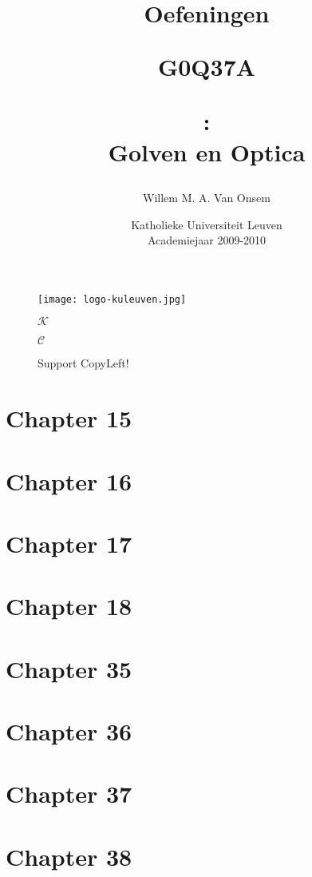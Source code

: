 \documentclass[a4paper,titlepage]{article}
\title{Oefeningen \begin{sffamily}G0Q37A\end{sffamily}:\\Golven en Optica}
\author{Willem M. A. Van Onsem}
\date{Katholieke Universiteit Leuven\\Academiejaar 2009-2010}
\begin{document}
\begin{titlepage}
\begin{figure*}[t]
\centering
\texttt{[image: logo-kuleuven.jpg]}
\end{figure*}
\begin{figure*}[b]
\centering
\begin{tiny}
$\mathcal{K}$
\end{tiny}
\begin{Huge}
\textcopyleft
\end{Huge}
\begin{tiny}
$\mathcal{C}$
\end{tiny}
\caption{Support CopyLeft!}
\end{figure*}
\maketitle
\end{titlepage}
\newpage
\section{Chapter 15}
\newpage
\section{Chapter 16}
\newpage
\section{Chapter 17}
\newpage
\section{Chapter 18}
\newpage
\section{Chapter 35}
\newpage
\section{Chapter 36}
\newpage
\section{Chapter 37}
\newpage
\section{Chapter 38}
\newpage
\end{document}
